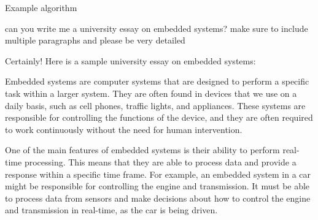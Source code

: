 Example algorithm
\begin{algorithm}[H]
    \caption{MOSA}


    \DontPrintSemicolon   

\end{algorithm}

can you write me a university essay on embedded systems? make sure to include multiple paragraphs and please be very detailed

Certainly! Here is a sample university essay on embedded systems:

Embedded systems are computer systems that are designed to perform a specific task within a larger system. They are often found in devices that we use on a daily basis, such as cell phones, traffic lights, and appliances. These systems are responsible for controlling the functions of the device, and they are often required to work continuously without the need for human intervention.

One of the main features of embedded systems is their ability to perform real-time processing. This means that they are able to process data and provide a response within a specific time frame. For example, an embedded system in a car might be responsible for controlling the engine and transmission. It must be able to process data from sensors and make decisions about how to control the engine and transmission in real-time, as the car is being driven.

